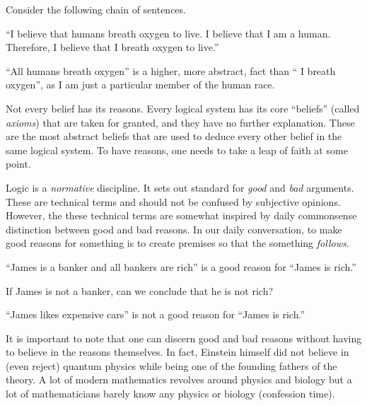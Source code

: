 \begin{example}
    Consider the following chain of sentences.

    ``I believe that humans breath oxygen to live. I believe that I am a human.
    Therefore, I believe that I breath oxygen to live.''

    ``All humans breath oxygen'' is a higher, more abstract, fact than `` I breath
    oxygen'', as I am just a particular member of the human race.
\end{example}

\begin{warning}
   Not every belief has its reasons. Every logical system has its core ``beliefs''
   (called \emph{axioms})
   that are taken for granted,
   and they have no further explanation.
   These are the most abstract beliefs that are used to deduce every other belief in
   the same logical system.
   To have reasons, one needs to take a leap of faith at some point.
\end{warning}


Logic is a \emph{normative} discipline.
It sets out standard for \emph{good} and \emph{bad} arguments.
These are technical terms and should not be confused by subjective opinions.
However, the these technical terms are somewhat inspired by daily
commonsense distinction between good and bad reasons.
In our daily conversation, to make good reasons for something is to create 
premises so that the something \emph{follows}.

\begin{example}
    ``James is a banker and all bankers are rich'' is a good reason for
    ``James is rich.''
\end{example}

\begin{question}
    If James is not a banker, can we conclude that he is not rich?
\end{question}

\begin{example}
    ``James likes expensive cars'' is not a good reason for ``James is rich.''
\end{example}


It is important to note that one can discern good and bad reasons without having to
believe in the reasons themselves.
In fact, Einstein himself did not believe in (even reject) 
quantum physics while being one of the 
founding fathers of the theory.
A lot of modern mathematics revolves around physics and biology but a lot of mathematicians barely know any physics or biology (confession time).

